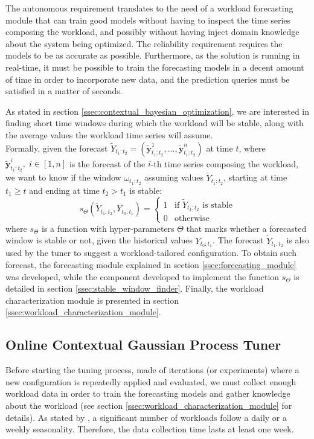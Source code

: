 \documentclass[a4paper]{article} %
\begin{document}
	The autonomous requirement translates to the need of a workload forecasting module that can train good models without having to inspect the time series composing the workload, and possibly without having inject domain knowledge about the system being optimized. The reliability requirement requires the models to be as accurate as possible. Furthermore, as the solution is running in real-time, it must be possible to train the forecasting models in a decent amount of time in order to incorporate new data, and the prediction queries must be satisfied in a matter of seconds.
	
	As stated in section \ref{ssec:contextual_bayesian_optimization}, we are interested in finding short time windows during which the workload will be stable, along with the average values the workload time series will assume. \\
	Formally, given the forecast $\tilde{Y}_{t_1:t_2} = (\tilde{\pmb{y}}_{t_1:t_2}^1, ..., \tilde{\pmb{y}}_{t_1:t_2}^n)$ at time $t$, where $\tilde{\pmb{y}}_{t_1:t_2}^i, \; i\in [1, n]$ is the forecast of the $i$-th time series composing the workload, we want to know if the window $\omega_{t_1:t_2}$ assuming values $\tilde{Y}_{t_1:t_2}$, starting at time $t_1 \geq t$ and ending at time $t_2 > t_1$ is stable: 
	\begin{equation}
		s_\Theta(\tilde{Y}_{t_1:t_2}, Y_{t_0:t_1}) = \begin{cases}
			1 & \text{if $\tilde{Y}_{t_1:t_2}$ is stable}\\
			0 & \text{otherwise}
		\end{cases}    
	\end{equation}
	where $s_\Theta$ is a function with hyper-parameters $\Theta$ that marks whether a forecasted window is stable or not, given the historical values $Y_{t_0:t_1}$. The forecast $\tilde{Y}_{t_1:t_2}$ is also used by the tuner to suggest a workload-tailored configuration.
	To obtain such forecast, the forecasting module explained in section \ref{ssec:forecasting_module} was developed, while the component developed to implement the function $s_\Theta$ is detailed in section \ref{ssec:stable_window_finder}. Finally, the workload characterization module is presented in section \ref{ssec:workload_characterization_module}. 
	
	\subsection{Online Contextual Gaussian Process Tuner}
	Before starting the tuning process, made of iterations (or experiments) where a new configuration is repeatedly applied and evaluated, we must collect enough workload data in order to train the forecasting models and gather knowledge about the workload (see section \ref{ssec:workload_characterization_module} for details).
	As stated by \cite{Seagull}, a significant number of workloads follow a daily or a weekly seasonality. Therefore, the data collection time lasts at least one week.
	 
\end{document}
